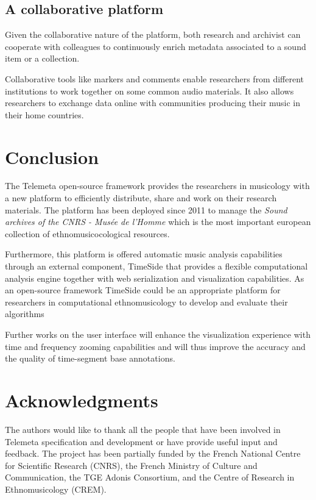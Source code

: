 \documentclass{paper}
\begin{document}
\subsection{A collaborative platform}
Given the collaborative nature of the platform, both research and archivist can cooperate with colleagues to continuously enrich metadata associated to a sound item or a collection.  

Collaborative tools like markers and comments enable researchers from different institutions to work together on some common audio materials.
It also allows researchers to exchange data online with communities producing their music in their home countries.


\section{Conclusion}

The Telemeta open-source framework provides the researchers in musicology with a new platform to efficiently distribute, share and work on their research materials.
The platform has been deployed since 2011 to manage the \emph{Sound archives of the CNRS - Musée de l'Homme} which is the most important european collection of ethnomusicocological resources.

Furthermore, this platform is offered automatic music analysis capabilities through an external component, TimeSide that provides a flexible computational analysis engine together with web serialization and visualization capabilities. As an open-source framework TimeSide could be an appropriate platform for researchers in computational ethnomusicology to develop and evaluate their algorithms

Further works on the user interface will enhance the visualization experience with time and frequency zooming capabilities and will thus improve the accuracy and the quality of time-segment base annotations.


\section*{Acknowledgments} 
{\small The authors would like to thank all the people that have been involved in Telemeta specification and development or have provide useful input and feedback. 
The project has been partially funded by the French National Centre for Scientific Research (CNRS), the French Ministry of Culture and Communication, the TGE Adonis Consortium, and the Centre of Research in Ethnomusicology (CREM).}


%

\end{document}
